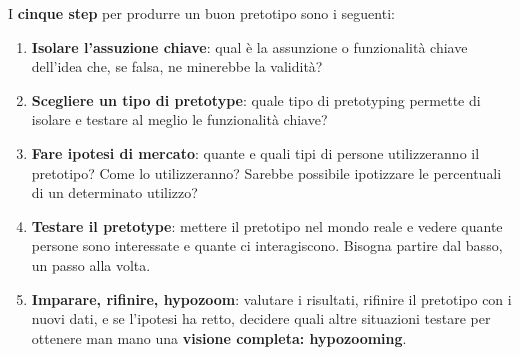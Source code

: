 \documentclass[a4paper,11pt,oneside]{book}
\begin{document}
I \textbf{cinque step} per produrre un buon pretotipo sono i seguenti:

\begin{enumerate}
	\item \textbf{Isolare l'assuzione chiave}: qual è la assunzione o funzionalità chiave dell'idea che, se falsa, ne minerebbe la validità?
	\item \textbf{Scegliere un tipo di pretotype}: quale tipo di pretotyping permette di isolare e testare al meglio le funzionalità chiave?
	\item \textbf{Fare ipotesi di mercato}: quante e quali tipi di persone utilizzeranno il pretotipo? Come lo utilizzeranno? Sarebbe possibile ipotizzare le percentuali di un determinato utilizzo?
	\item \textbf{Testare il pretotype}: mettere il pretotipo nel mondo reale e vedere quante persone sono interessate e quante ci interagiscono. Bisogna partire dal basso, un passo alla volta.
	\item \textbf{Imparare, rifinire, hypozoom}: valutare i risultati, rifinire il pretotipo con i nuovi dati, e se l'ipotesi ha retto, decidere quali altre situazioni testare per ottenere man mano una \textbf{visione completa: hypozooming}.
\end{enumerate}

\pagebreak
\end{document}
